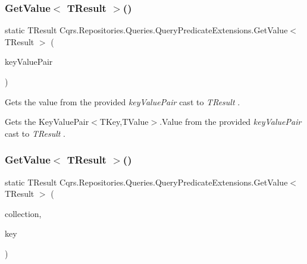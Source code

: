\subsubsection{\texorpdfstring{Get\+Value$<$ T\+Result $>$()}{GetValue< TResult >()}\hspace{0.1cm}{\footnotesize\ttfamily [1/7]}}
{\footnotesize\ttfamily static T\+Result Cqrs.\+Repositories.\+Queries.\+Query\+Predicate\+Extensions.\+Get\+Value$<$ T\+Result $>$ (\begin{DoxyParamCaption}\item[{this Key\+Value\+Pair$<$ string, object $>$}]{key\+Value\+Pair }\end{DoxyParamCaption})\hspace{0.3cm}{\ttfamily [static]}}



Gets the value from the provided {\itshape key\+Value\+Pair}  cast to {\itshape T\+Result} . 

Gets the Key\+Value\+Pair$<$\+T\+Key,\+T\+Value$>$.\+Value from the provided {\itshape key\+Value\+Pair}  cast to {\itshape T\+Result} . \mbox{\label{classCqrs_1_1Repositories_1_1Queries_1_1QueryPredicateExtensions_ae7ce4440706b552213ec680ac3391b7a_ae7ce4440706b552213ec680ac3391b7a}} 
\subsubsection{\texorpdfstring{Get\+Value$<$ T\+Result $>$()}{GetValue< TResult >()}\hspace{0.1cm}{\footnotesize\ttfamily [2/7]}}
{\footnotesize\ttfamily static T\+Result Cqrs.\+Repositories.\+Queries.\+Query\+Predicate\+Extensions.\+Get\+Value$<$ T\+Result $>$ (\begin{DoxyParamCaption}\item[{this I\+Set$<$ Key\+Value\+Pair$<$ string, object $>$$>$}]{collection,  }\item[{string}]{key }\end{DoxyParamCaption})\hspace{0.3cm}{\ttfamily [static]}}



